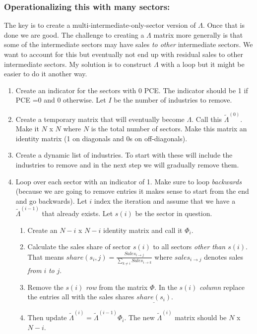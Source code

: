 \documentclass[12pt,english]{article}
\begin{document}
\subsubsection{Operationalizing this with many sectors:}
The key is to create a multi-intermediate-only-sector version of $\Lambda$. Once that is done we are good. The challenge to creating a $\Lambda$ matrix more generally is that some of the intermediate sectors may have sales \emph{to other} intermediate sectors. We want to account for this but eventually not end up with residual sales to other intermediate sectors. My solution is to construct $\Lambda$ with a loop but it might be easier to do it another way.
\begin{enumerate}
	\item Create an indicator for the sectors with 0 PCE. The indicator should be 1 if PCE =0 and 0 otherwise. Let $I$ be the number of industries to remove.
	\item Create a temporary matrix that will eventually become $\Lambda$. Call this $\tilde{\Lambda}^{(0)}$. Make it $N$ x $N$ where $N$ is the total number of sectors. Make this matrix an identity matrix (1 on diagonals and 0s on off-diagonals).
	\item Create a dynamic list of industries. To start with these will include the industries to remove and in the next step we will gradually remove them.
	\item Loop over each sector with an indicator of 1. Make sure to loop \emph{backwards} (because we are going to remove entries it makes sense to start from the end and go backwards). Let $i$ index the iteration and assume that we have a $\tilde{\Lambda}^{(i-1)}$ that already exists. Let $s(i)$ be the sector in question.
	\begin{enumerate}
		\item Create an $N-i$ x $N-i$ identity matrix and call it $\Phi_i$.
		\item Calculate the sales share of sector $s(i)$ to all sectors \emph{other than $s(i)$}. That means $share(s_i,j) = \frac{Sales_{i\rightarrow j}}{\sum_{k\neq i} Sales_{i\rightarrow k}}$ where $sales_{i\rightarrow j}$ denotes sales \emph{from} $i$ \emph{to} $j$.
		\item Remove the $s(i)$ \emph{row} from the matrix $\Phi$. In the $s(i)$ \emph{column} replace the entries all with the sales shares $\underline{share(s_i)}$.
		\item Then update $\tilde{\Lambda}^{(i)} = \tilde{\Lambda}^{(i-1)}\Phi_i$. The new $\tilde{\Lambda}^{(i)}$ matrix should be $N$ x $N-i$.

\end{enumerate}
\end{enumerate}
\end{document}

